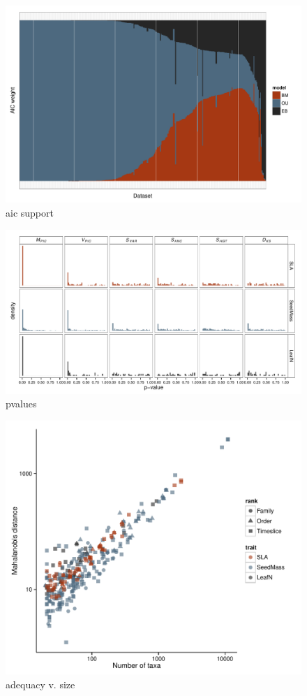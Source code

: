\documentclass[a4paper,12pt]{article}
\begin{document}
\begin{figure}[p]
  \centering
  \includegraphics[scale=0.7]{figs/AIC-support}
  \caption{aic support}
  \label{fig:aic-support}
\end{figure}

\begin{figure}[p]
  \centering
  \includegraphics{figs/pvalue-hist-ML}
  \caption{pvalues}
  \label{fig:pvalues}
\end{figure}

\begin{figure}[p]
  \centering
  \includegraphics[scale=0.9]{figs/Size-adequacy-ML-bestonly}
  \caption{adequacy v. size}
  \label{fig:size-adequacy}
\end{figure}
\end{document}
